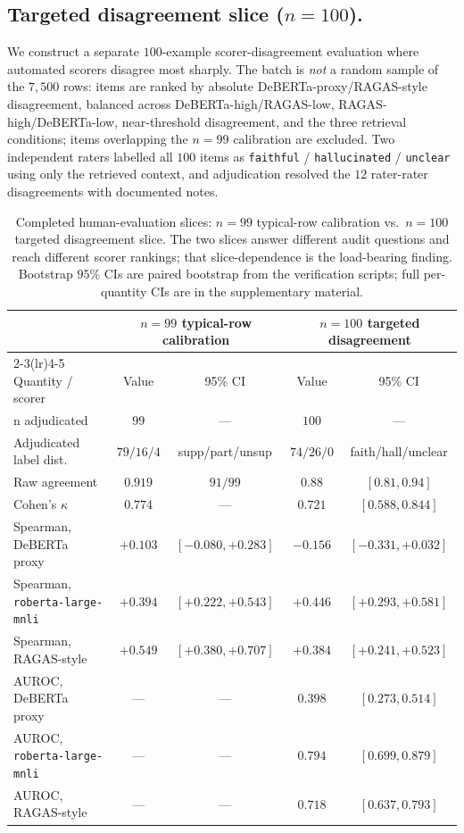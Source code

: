 \subsection{Targeted disagreement slice \texorpdfstring{($n=100$)}{(n=100)}.}
\label{sec:human_cal_disagreement}

We construct a separate $100$-example scorer-disagreement evaluation
where automated scorers disagree most sharply. The batch is \emph{not}
a random sample of the $7{,}500$ rows: items are ranked by absolute
DeBERTa-proxy/RAGAS-style disagreement, balanced across
DeBERTa-high/RAGAS-low, RAGAS-high/DeBERTa-low, near-threshold
disagreement, and the three retrieval conditions; items overlapping
the $n=99$ calibration are excluded. Two independent raters labelled
all $100$ items as
\texttt{faithful} / \texttt{hallucinated} / \texttt{unclear} using
only the retrieved context, and adjudication resolved the $12$
rater-rater disagreements with documented notes.

\begin{table}[!htb]
\centering
\caption{Completed human-evaluation slices: $n=99$ typical-row
calibration vs.\ $n=100$ targeted disagreement slice. The
two slices answer different audit questions and reach different
scorer rankings; that slice-dependence is the load-bearing finding.
Bootstrap $95\%$ CIs are paired bootstrap from the verification
scripts; full per-quantity CIs are in the supplementary material.}
\label{tab:human_combined_main}
\footnotesize
\begin{tabular}{lcccc}
\toprule
& \multicolumn{2}{c}{$n=99$ typical-row calibration} & \multicolumn{2}{c}{$n=100$ targeted disagreement} \\
\cmidrule(lr){2-3}\cmidrule(lr){4-5}
Quantity / scorer & Value & 95\% CI & Value & 95\% CI \\
\midrule
n adjudicated & $99$ & --- & $100$ & --- \\
Adjudicated label dist.\ & $79/16/4$ & supp/part/unsup & $74/26/0$ & faith/hall/unclear \\
Raw agreement & $0.919$ & $91/99$ & $0.88$ & $[0.81, 0.94]$ \\
Cohen's $\kappa$ & $0.774$ & --- & $0.721$ & $[0.588, 0.844]$ \\
\addlinespace
Spearman, DeBERTa proxy & $+0.103$ & $[-0.080, +0.283]$ & $-0.156$ & $[-0.331, +0.032]$ \\
Spearman, \texttt{roberta-large-mnli} & $+0.394$ & $[+0.222, +0.543]$ & $+0.446$ & $[+0.293, +0.581]$ \\
Spearman, RAGAS-style & $+0.549$ & $[+0.380, +0.707]$ & $+0.384$ & $[+0.241, +0.523]$ \\
\addlinespace
AUROC, DeBERTa proxy & --- & --- & $0.398$ & $[0.273, 0.514]$ \\
AUROC, \texttt{roberta-large-mnli} & --- & --- & $0.794$ & $[0.699, 0.879]$ \\
AUROC, RAGAS-style & --- & --- & $0.718$ & $[0.637, 0.793]$ \\
\bottomrule
\end{tabular}
\end{table}

